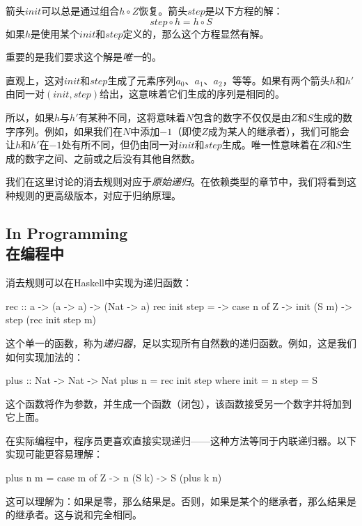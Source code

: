 \documentclass[DaoFP]{subfiles}
\begin{document}
    箭头$\mathit{init}$可以总是通过组合$h \circ Z$恢复。箭头$\mathit{step}$是以下方程的解：
    \[ \mathit{step} \circ h = h \circ S \]
    如果$h$是使用某个$\mathit{init}$和$\mathit{step}$定义的，那么这个方程显然有解。

    重要的是我们要求这个解是\emph{唯一}的。

    直观上，这对$\mathit{init}$和$\mathit{step}$生成了元素序列$a_0$、$a_1$、$a_2$，等等。如果有两个箭头$h$和$h'$由同一对$(\mathit{init}, \mathit{step})$给出，这意味着它们生成的序列是相同的。

    所以，如果$h$与$h'$有某种不同，这将意味着$N$包含的数字不仅仅是由$Z$和$S$生成的数字序列。例如，如果我们在$N$中添加$-1$（即使$Z$成为某人的继承者），我们可能会让$h$和$h'$在$-1$处有所不同，但仍由同一对$\mathit{init}$和$\mathit{step}$生成。唯一性意味着在$Z$和$S$生成的数字之间、之前或之后没有其他自然数。

    我们在这里讨论的消去规则对应于\emph{原始递归}。在依赖类型的章节中，我们将看到这种规则的更高级版本，对应于归纳原理。

    \subsection{In Programming\\在编程中}

    消去规则可以在Haskell中实现为递归函数：

    \begin{haskell}
        rec :: a -> (a -> a) -> (Nat -> a)
        rec init step = \n ->
        case n of
        Z     -> init
        (S m) -> step (rec init step m)
    \end{haskell}

    这个单一的函数，称为\emph{递归器}，足以实现所有自然数的递归函数。例如，这是我们如何实现加法的：

    \begin{haskell}
        plus :: Nat -> Nat -> Nat
        plus n = rec init step
        where
        init = n
        step = S
    \end{haskell}
    这个函数将作为参数，并生成一个函数（闭包），该函数接受另一个数字并将加到它上面。

    在实际编程中，程序员更喜欢直接实现递归——这种方法等同于内联递归器。以下实现可能更容易理解：
    \begin{haskell}
        plus n m = case m of
        Z -> n
        (S k) -> S (plus k n)
    \end{haskell}
    这可以理解为：如果是零，那么结果是。否则，如果是某个的继承者，那么结果是的继承者。这与说和完全相同。
\end{document}
